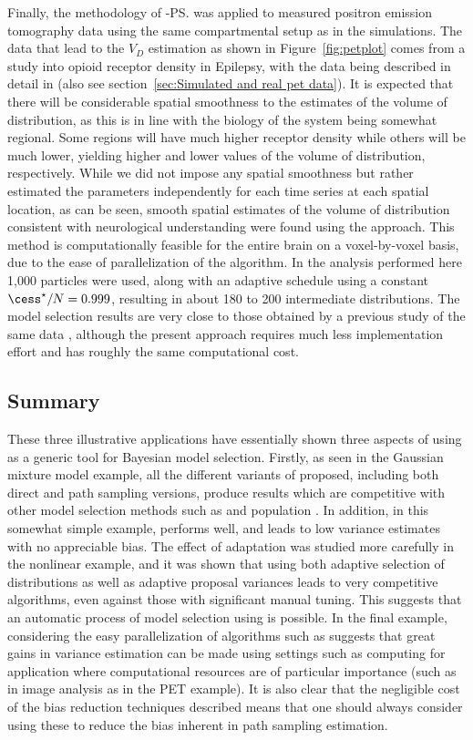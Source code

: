 Finally, the methodology of \smc[2]-\ps was applied to measured positron
emission tomography data using the same compartmental setup as in the
simulations. The data that lead to the $V_D$ estimation as shown in
Figure~\ref{fig:petplot} comes from a study into opioid receptor density in
Epilepsy, with the data being described in detail in \cite{Jiang:2009kf} (also
see section~\ref{sec:Simulated and real pet data}). It is expected that there
will be considerable spatial smoothness to the estimates of the volume of
distribution, as this is in line with the biology of the system being somewhat
regional. Some regions will have much higher receptor density while others
will be much lower, yielding higher and lower values of the volume of
distribution, respectively.  While we did not impose any spatial smoothness
but rather estimated the parameters independently for each time series at each
spatial location, as can be seen, smooth spatial estimates of the volume of
distribution consistent with neurological understanding were found using the
approach. This method is computationally feasible for the entire brain on a
voxel-by-voxel basis, due to the ease of parallelization of the \smc
algorithm. In the analysis performed here 1,000 particles were used, along
with an adaptive schedule using a constant $\cess^\star/N = 0.999$, resulting
in about 180 to 200 intermediate distributions. The model selection results
are very close to those obtained by a  previous study of the same data
\cite{Zhou2013}, although the present approach requires much less
implementation effort and has roughly the same computational cost.

\subsection{Summary}

These three illustrative applications have essentially shown three aspects of
using \smc as a generic tool for Bayesian model selection. Firstly, as seen in
the Gaussian mixture model example, all the different variants of \smc
proposed, including both direct and path sampling versions, produce results
which are competitive with other model selection methods such as \rjmcmc and
population \mcmc. In addition, in this somewhat simple example, \smc[2]
performs well, and leads to low variance estimates with no appreciable bias.
The effect of adaptation was studied more carefully in the nonlinear \ode
example, and it was shown that using both adaptive selection of distributions
as well as adaptive proposal variances leads to very competitive algorithms,
even against those with significant manual tuning. This suggests that an
automatic process of model selection using \smc[2] is possible. In the final
example, considering the easy parallelization of algorithms such as \smc[2]
suggests that great gains in variance estimation can be made using settings
such as \gpu computing for application where computational resources are of
particular importance (such as in image analysis as in the PET example). It is
also clear that the negligible cost of the bias reduction techniques described
means that one should always consider using these to reduce the bias inherent
in path sampling estimation.

